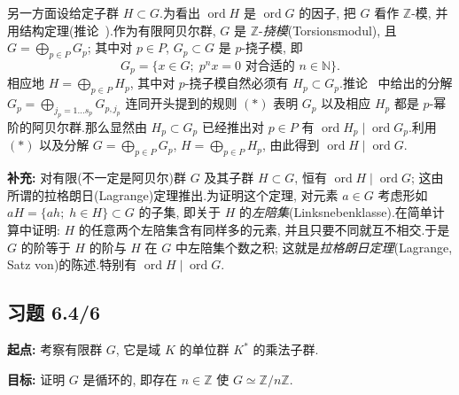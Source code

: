 另一方面设给定子群 $H \subset G$.为看出 $\operatorname{ord} H$ 是 $\operatorname{ord} G$ 的因子, 把 $G$ 看作 $\mathbb{Z}$-模, 并用结构定理(推论~).作为有限阿贝尔群, $G$ 是 $\mathbb{Z}$-\emph{挠模}(\textup{Torsionsmodul}), 且 $G = \bigoplus_{p \in P} G_p$; 其中对 $p \in P$, $G_p \subset G$ 是 $p$-挠子模, 即
\[
G_p = \{x \in G;\; p^n x = 0 \text{ 对合适的 } n \in \mathbb{N}\}\text{.}
\]
相应地 $H = \bigoplus_{p \in P} H_p$, 其中对 $p$-挠子模自然必须有 $H_p \subset G_p$.推论~ 中给出的分解 $G_p = \bigoplus_{j_p = 1 \ldots s_p} G_{p, j_p}$ 连同开头提到的规则 $(*)$ 表明 $G_p$ 以及相应 $H_p$ 都是 $p$-幂阶的阿贝尔群.那么显然由 $H_p \subset G_p$ 已经推出对 $p \in P$ 有 $\operatorname{ord} H_p \mid \operatorname{ord} G_p$.利用 $(*)$ 以及分解 $G = \bigoplus_{p \in P} G_p$, $H = \bigoplus_{p \in P} H_p$, 由此得到 $\operatorname{ord} H \mid \operatorname{ord} G$.

\noindent\textbf{补充:} 对有限(不一定是阿贝尔)群 $G$ 及其子群 $H \subset G$, 恒有 $\operatorname{ord} H \mid \operatorname{ord} G$; 这由所谓的拉格朗日(Lagrange)定理推出.为证明这个定理, 对元素 $a \in G$ 考虑形如 $aH = \{ah;\; h \in H\} \subset G$ 的子集, 即关于 $H$ 的\emph{左陪集}(\textup{Linksnebenklasse}).在简单计算中证明: $H$ 的任意两个左陪集含有同样多的元素, 并且只要不同就互不相交.于是 $G$ 的阶等于 $H$ 的阶与 $H$ 在 $G$ 中左陪集个数之积; 这就是\emph{拉格朗日定理}(\textup{Lagrange, Satz von})的陈述.特别有 $\operatorname{ord} H \mid \operatorname{ord} G$.

\subsection*{习题 6.4/6}

\noindent\textbf{起点:} 考察有限群 $G$, 它是域 $K$ 的单位群 $K^*$ 的乘法子群.

\noindent\textbf{目标:} 证明 $G$ 是循环的, 即存在 $n \in \mathbb{Z}$ 使 $G \simeq \mathbb{Z}/n \mathbb{Z}$.

